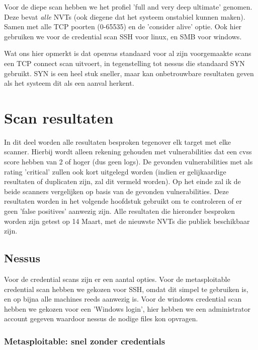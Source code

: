 Voor de diepe scan hebben we het profiel 'full and very deep ultimate' genomen. Deze bevat \textit{alle} NVTs (ook diegene dat het systeem onstabiel kunnen maken). Samen met alle TCP poorten (0-65535) en de 'consider alive' optie. Ook hier gebruiken we voor de credential scan SSH voor linux, en SMB voor windows.

Wat ons hier opmerkt is dat openvas standaard voor al zijn voorgemaakte scans een TCP connect scan uitvoert, in tegenstelling tot nessus die standaard SYN gebruikt. SYN is een heel stuk sneller, maar kan onbetrouwbare resultaten geven als het systeem dit als een aanval herkent.


\section{Scan resultaten}

In dit deel worden alle resultaten besproken tegenover elk target met elke scanner. Hierbij wordt alleen rekening gehouden met vulnerabilities dat een cvss score hebben van 2 of hoger (dus geen logs). De gevonden vulnerabilities met als rating 'critical' zullen ook kort uitgelegd worden (indien er gelijkaardige resultaten of duplicaten zijn, zal dit vermeld worden). Op het einde zal ik de beide scanners vergelijken op basis van de gevonden vulnerabilities. Deze resultaten worden in het volgende hoofdstuk gebruikt om te controleren of er geen 'false positives' aanwezig zijn. Alle resultaten die hieronder besproken worden zijn getest op 14 Maart, met de nieuwste NVTs die publiek beschikbaar zijn.

\subsection{Nessus}

Voor de credential scans zijn er een aantal opties. Voor de metasploitable credential scan hebben we gekozen voor SSH, omdat dit simpel te gebruiken is, en op bijna alle machines reeds aanwezig is. Voor de windows credential scan hebben we gekozen voor een 'Windows login', hier hebben we een administrator account gegeven waardoor nessus de nodige files kon opvragen.

\subsubsection{Metasploitable: snel zonder credentials}

